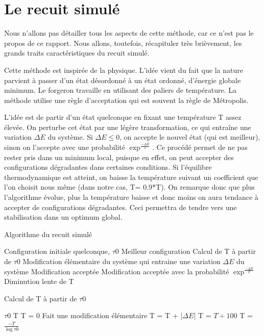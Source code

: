 \documentclass{report}
\begin{document}
\section{Le recuit simulé}
Nous n’allons pas détailler tous les aspects de cette méthode, car ce n’est pas le
propos de ce rapport. Nous allons, toutefois, récapituler très brièvement, les grands
traits caractéristiques du recuit simulé.

Cette méthode est inspirée de la physique. L’idée vient du fait que la nature parvient à passer d’un état désordonné à un état ordonné, d’énergie globale minimum.
Le forgeron travaille en utilisant des paliers de température. La méthode utilise une
règle d’acceptation qui est souvent la règle de Métropolis.

L'idée est de partir d'un état quelconque en fixant une température T assez élevée. On perturbe cet état par une légère transformation, ce qui entraîne une variation $\Delta{E}$ du système. Si $\Delta{E} \leq 0$, on accepte le nouvel état (qui est meilleur), sinon on l'accepte avec une probabilité $\exp^{\frac{-\Delta E}{T}}$. Ce procédé permet de ne pas rester pris dans un minimum local, puisque en effet, on peut accepter des configurations dégradantes dans certaines conditions. Si l'équilibre thermodynamique est atteint, on baisse la température suivant un coefficient que l'on choisit nous même (dans notre cas, T= 0.9*T). On remarque donc que plus l'algorithme évolue, plus la température baisse et donc moins on aura tendance à accepter de configurations dégradantes. Ceci permettra de tendre vers une stabilisation dans un optimum global.
\begin{algorithm}
\caption{Algorithme du recuit simulé}
\begin{algorithmic}
\REQUIRE Configuration initiale quelconque, $\tau 0$
\ENSURE Meilleur configuration
\STATE Calcul de T à partir de $\tau 0$
\STATE Modification élémentaire du système qui entraine une variation $\Delta E$ du système
\STATE Modification acceptée
\ELSE
\STATE Modification acceptée avec la probabilité $\exp^{\frac{-\Delta E}{T}}$
\ENDIF
{}
\STATE Diminution lente de T
\ENDIF
\ENDWHILE
\end{algorithmic}

\end{algorithm}
\begin{algorithm}
\caption{Calcul de T à partir de $\tau 0$}
\begin{algorithmic}
\REQUIRE $\tau 0$
\ENSURE T
\STATE T = 0
\STATE Fait une modification élémentaire
\STATE T = T + |$\Delta E$|
\ENDWHILE
\STATE T = $T \div 100$
\STATE T = $\frac{-T}{\log \tau 0}$
\end{algorithmic}
\end{algorithm}
\end{document}
